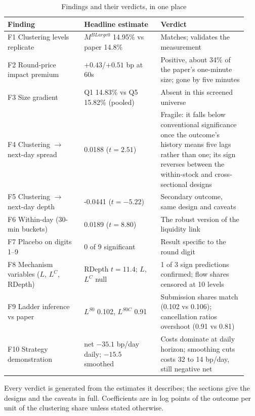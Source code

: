 \begin{table}[htbp]
\centering
\caption{Findings and their verdicts, in one place}
\label{tab:findings}
\small
\begin{threeparttable}
\begin{tabular}{@{}p{0.30\linewidth}p{0.30\linewidth}p{0.34\linewidth}@{}}
\toprule
Finding & Headline estimate & Verdict \\
\midrule
F1 Clustering levels replicate & $M^{BLarge0}$ 14.95\% vs paper 14.8\% & Matches; validates the measurement \\
F2 Round-price impact premium & $+0.43$/$+0.51$ bp at 60s & Positive, about 34\% of the paper's one-minute size; gone by five minutes \\
F3 Size gradient & Q1 14.83\% vs Q5 15.82\% (pooled) & Absent in this screened universe \\
F4 Clustering $\to$ next-day spread & 0.0188 ($t=2.51$) & Fragile: it falls below conventional significance once the outcome's history means five lags rather than one; its sign reverses between the within-stock and cross-sectional designs \\
F5 Clustering $\to$ next-day depth & -0.0441 ($t=-5.22$) & Secondary outcome, same design and caveats \\
F6 Within-day (30-min buckets) & 0.0189 ($t=8.80$) & The robust version of the liquidity link \\
F7 Placebo on digits 1--9 & 0 of 9 significant & Result specific to the round digit \\
F8 Mechanism variables ($L$, $L^{C}$, RDepth) & RDepth $t=11.4$; $L$, $L^{C}$ null & 1 of 3 sign predictions confirmed; flow shares censored at 10 levels \\
F9 Ladder inference vs paper & $L^{S0}$ 0.102, $L^{S0C}$ 0.91 & Submission shares match (0.102 vs 0.106); cancellation ratios overshoot (0.91 vs 0.81) \\
F10 Strategy demonstration & net $-35.1$ bp/day daily; $-15.5$ smoothed & Costs dominate at daily horizon; smoothing cuts costs 32 to 14 bp/day, still negative net \\
\bottomrule
\end{tabular}
\begin{tablenotes}[flushleft]\footnotesize
\item Every verdict is generated from the estimates it describes; the sections give the designs and the caveats in full. Coefficients are in log points of the outcome per unit of the clustering share unless stated otherwise.
\end{tablenotes}
\end{threeparttable}
\end{table}
